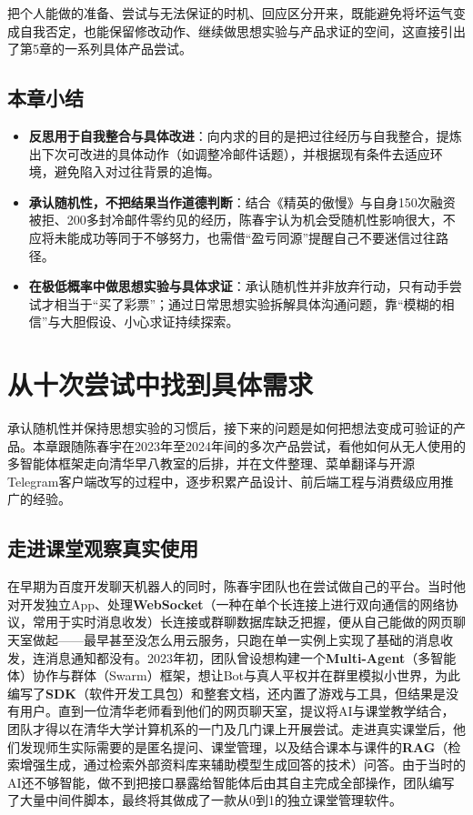 \documentclass[UTF8,a4paper,11pt,fontset=fandol]{ctexart}
\begin{document}
把个人能做的准备、尝试与无法保证的时机、回应区分开来，既能避免将坏运气变成自我否定，也能保留修改动作、继续做思想实验与产品求证的空间，这直接引出了第5章的一系列具体产品尝试。
\subsection{本章小结}
\begin{itemize}
\item \textbf{反思用于自我整合与具体改进}：向内求的目的是把过往经历与自我整合，提炼出下次可改进的具体动作（如调整冷邮件话题），并根据现有条件去适应环境，避免陷入对过往背景的追悔。
\item \textbf{承认随机性，不把结果当作道德判断}：结合《精英的傲慢》与自身150次融资被拒、200多封冷邮件零约见的经历，陈春宇认为机会受随机性影响很大，不应将未能成功等同于不够努力，也需借“盈亏同源”提醒自己不要迷信过往路径。
\item \textbf{在极低概率中做思想实验与具体求证}：承认随机性并非放弃行动，只有动手尝试才相当于“买了彩票”；通过日常思想实验拆解具体沟通问题，靠“模糊的相信”与大胆假设、小心求证持续探索。
\end{itemize}
\section{从十次尝试中找到具体需求}
承认随机性并保持思想实验的习惯后，接下来的问题是如何把想法变成可验证的产品。本章跟随陈春宇在2023年至2024年间的多次产品尝试，看他如何从无人使用的多智能体框架走向清华早八教室的后排，并在文件整理、菜单翻译与开源Telegram客户端改写的过程中，逐步积累产品设计、前后端工程与消费级应用推广的经验。
\subsection{走进课堂观察真实使用}
在早期为百度开发聊天机器人的同时，陈春宇团队也在尝试做自己的平台。当时他对开发独立App、处理\textbf{WebSocket}（一种在单个长连接上进行双向通信的网络协议，常用于实时消息收发）长连接或群聊数据库缺乏把握，便从自己能做的网页聊天室做起——最早甚至没怎么用云服务，只跑在单一实例上实现了基础的消息收发，连消息通知都没有。2023年初，团队曾设想构建一个\textbf{Multi-Agent}（多智能体）协作与群体（Swarm）框架，想让Bot与真人平权并在群里模拟小世界，为此编写了\textbf{SDK}（软件开发工具包）和整套文档，还内置了游戏与工具，但结果是没有用户。直到一位清华老师看到他们的网页聊天室，提议将AI与课堂教学结合，团队才得以在清华大学计算机系的一门及几门课上开展尝试。走进真实课堂后，他们发现师生实际需要的是匿名提问、课堂管理，以及结合课本与课件的\textbf{RAG}（检索增强生成，通过检索外部资料库来辅助模型生成回答的技术）问答。由于当时的AI还不够智能，做不到把接口暴露给智能体后由其自主完成全部操作，团队编写了大量中间件脚本，最终将其做成了一款从0到1的独立课堂管理软件。
\end{document}
